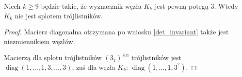 \begin{proposition}
    Niech $k \ge 9$ będzie takie, że wyznacznik węzła $K_k$ jest pewną potęgą $3$.
    Wtedy $K_k$ nie jest splotem trójlistników.
\end{proposition}

\begin{proof}
    Macierz diagonalna otrzymana po wniosku \ref{det_invariant} także jest niezmiennikiem węzłów.

    Macierzą dla splotu trójlistników $(3_1)^{\# n}$ trójlistników jest $\operatorname{diag}(1, \ldots, 1, 3, \ldots, 3)$, zaś dla węzła $K_k$: $\operatorname{diag} (1, \ldots, 1, 3^?)$.
\end{proof}
